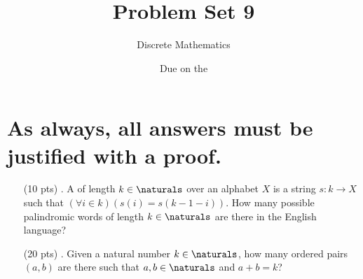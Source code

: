 

\title{Problem Set 9}
\author[Daniel Gonzalez Cedre]{Discrete Mathematics}
\date{Due on the }

\usepackage{xskak}



\maketitle

\section{As always, all answers must be justified with a proof.}

\begin{enumerate}
  \item[(10 pts) \quad 1.]
    A  of length $k \in \naturals$ over an alphabet $X$ is a string $s: k \to X$ such that $(\forall i \in k)(s(i) = s(k - 1 - i))$.
    How many possible palindromic words of length $k \in \naturals$ are there in the English language?%

  \item[(20 pts) \quad 2.]
     Given a natural number $k \in \naturals$, how many ordered pairs $(a, b)$ are there such that $a, b \in \naturals$ and $a + b = k$?


\end{enumerate}
